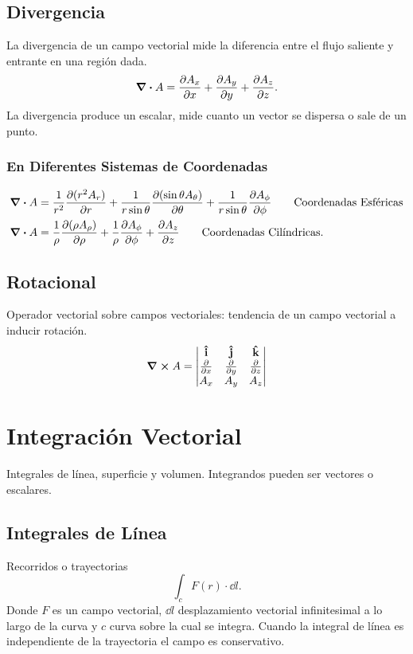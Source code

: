 \subsection{Divergencia}
La divergencia de un campo vectorial mide la diferencia entre el flujo saliente y entrante en una región dada.
\begin{equation}
	\div{A} = \pdv{A_x}{x} + \pdv{A_y}{y} + \pdv{A_z}{z}.
\end{equation}
La divergencia produce un escalar, mide cuanto un vector se dispersa o sale de un punto.
\subsubsection{En Diferentes Sistemas de Coordenadas}
\begin{align*}
	\div{A} &= \frac{1}{r^2} \pdv{(r^2 A_r)}{r} + \frac{1}{r\sin{\theta}} \pdv{(\sin{\theta} A_\theta)}{\theta} + \frac{1}{r\sin{\theta}} \pdv{A_\phi}{\phi} \qquad \text{Coordenadas Esféricas} \\
	\div{A} &= \frac{1}{\rho} \pdv{(\rho A_\rho)}{\rho} + \frac{1}{\rho} \pdv{A_\phi}{\phi} + \pdv{A_z}{z} \qquad \text{Coordenadas Cilíndricas.}
\end{align*}








\subsection{Rotacional}
Operador vectorial sobre campos vectoriales: tendencia de un campo vectorial a inducir rotación.
\begin{equation}
	\curl{A} = \mqty| \vi & \vj & \vk \\ \pdv{x} & \pdv{y} & \pdv{z} \\ A_x & A_y & A_z |
\end{equation}


\section{Integración Vectorial}
Integrales de línea, superficie y volumen. Integrandos pueden ser vectores o escalares. \\
\subsection{Integrales de Línea}
Recorridos o trayectorias
\begin{equation}
	\int _c F(r) \cdot \dd{l}.
\end{equation}
Donde $F$ es un campo vectorial, $\dd{l}$ desplazamiento vectorial infinitesimal a lo largo de la curva y $c$ curva sobre la cual se integra. Cuando la integral de línea es independiente de la trayectoria el campo es conservativo.

